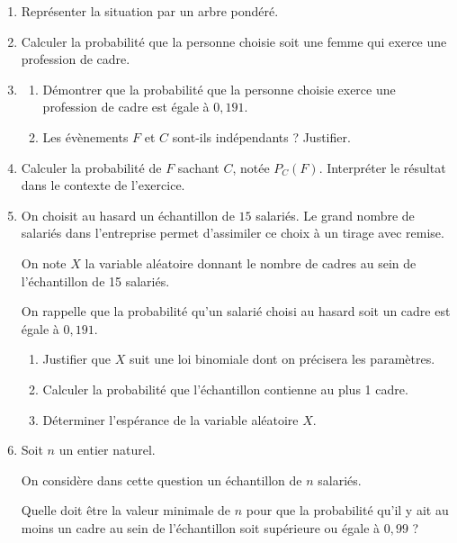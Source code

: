 \begin{enumerate}
\item Représenter la situation par un arbre pondéré.
\item Calculer la probabilité que la personne choisie soit une femme qui exerce une profession de cadre.
\item 
	\begin{enumerate}
		\item Démontrer que la probabilité que la personne choisie exerce une profession de cadre est égale à $0,191$.
		\item Les évènements $F$ et $C$ sont-ils indépendants ? Justifier.
	\end{enumerate}	
\item Calculer la probabilité de $F$ sachant $C$, notée $P_C(F)$. Interpréter le résultat dans le
contexte de l'exercice.
\item On choisit au hasard un échantillon de $15$ salariés. Le grand nombre de salariés
dans l'entreprise permet d'assimiler ce choix à un tirage avec remise. 

On note $X$ la variable aléatoire donnant le nombre de cadres au sein de
l'échantillon de 15 salariés.

On rappelle que la probabilité qu'un salarié choisi au hasard soit un cadre est
égale à $0,191$.
	\begin{enumerate}
		\item Justifier que $X$ suit une loi binomiale dont on précisera les paramètres. 
		\item Calculer la probabilité que l'échantillon contienne au plus 1 cadre.
		\item Déterminer l'espérance de la variable aléatoire $X$.
	\end{enumerate}	
\item Soit $n$ un entier naturel.

On considère dans cette question un échantillon de $n$ salariés.

Quelle doit être la valeur minimale de $n$ pour que la probabilité qu'il y ait au moins un cadre au sein de l'échantillon soit supérieure ou égale à $0,99$ ?
\end{enumerate}

\bigskip
